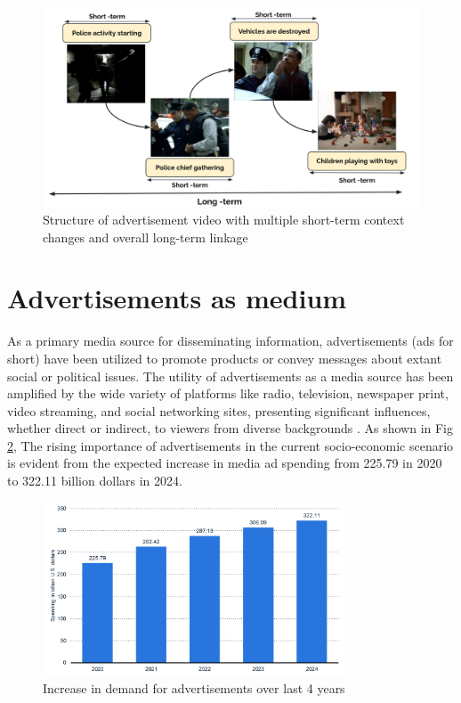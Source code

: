 \begin{figure}[h!]
\centering
\includegraphics[width=\textwidth]{figures/ads_structure_figure.png}
\caption{Structure of advertisement video with multiple short-term context changes and overall long-term linkage}
\label{ads_structure_set}
\end{figure}

\section{Advertisements as medium}
As a primary media source for disseminating information, advertisements (ads for short) have been utilized to promote products or convey messages about extant social or political issues. The utility of advertisements as a media source has been amplified by the wide variety of platforms like radio, television, newspaper print, video streaming, and social networking sites, presenting significant influences, whether direct or indirect, to viewers from diverse backgrounds \cite{Pardun}. As shown in Fig \ref{ads_spending}, The rising importance of advertisements in the current socio-economic scenario is evident from the expected increase in media ad spending from 225.79 in 2020 to 322.11 billion dollars in 2024.

\begin{figure}[h!]
\centering
\includegraphics[width=0.8\textwidth]{figures/statistic_ads_spending.png}
\caption{Increase in demand for advertisements over last 4 years}
\label{ads_spending}
\end{figure}

